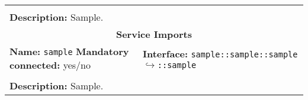 \begin{center}
\begin{tabular}{|p{7.5cm}|p{7.5cm}|}
		\multicolumn{2}{|l|}{}\\
		\multicolumn{2}{|p{15cm}|}{\textbf{Description:} \newline Sample.}\\
		\hline
		\hline
		\multicolumn{2}{|c|}{\textbf{\large Service Imports}}\\
		\hline
		\multicolumn{1}{|p{7.5cm}}{\textbf{Name:} \texttt{sample} \newline \textbf{Mandatory connected:} yes/no} & \multicolumn{1}{p{7.5cm}|}{\textbf{Interface:} \newline \texttt{sample::sample::sample} \newline$\hookrightarrow$\texttt{::sample}}\\
		\multicolumn{2}{|l|}{}\\
		\multicolumn{2}{|p{15cm}|}{\textbf{Description:} \newline Sample.}\\
		\hline
	\end{tabular}
\end{center}

